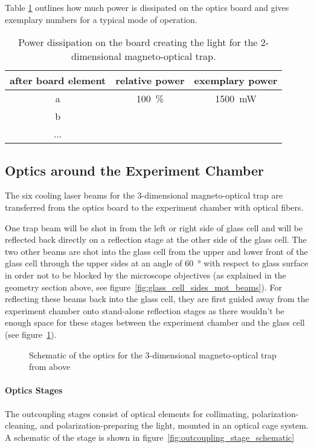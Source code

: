 Table \ref{tab:power_cascade} outlines how much power is dissipated on the optics board and gives exemplary numbers for a typical mode of operation.

\begin{table}
    \begin{tabularx}{\textwidth}{ccc}
        \toprule
        after board element & relative power & exemplary power \\
        \midrule
        a & \SI{100}{\percent} & \SI{1500}{\milli\watt}\\
        b && \\
        ... && \\
        \bottomrule
    \end{tabularx}
    \caption{Power dissipation on the board creating the light for the 2-dimensional magneto-optical trap.
    }
    \label{tab:power_cascade}
\end{table}


\subsection*{Optics around the Experiment Chamber}
The six cooling laser beams for the 3-dimensional magneto-optical trap are transferred from the optics board to the experiment chamber with optical fibers. 

One trap beam will be shot in from the left or right side of glass cell and will be reflected back directly on a reflection stage at the other side of the glass cell. The two other beams are shot into the glass cell from the upper and lower front of the glass cell through the upper sides at an angle of \SI{60}{\degree} with respect to glass surface in order not to be blocked by the microscope objectives (as explained in the geometry section above, see figure~\ref{fig:glass_cell_sides_mot_beams}). For reflecting these beams back into the glass cell, they are first guided away from the experiment chamber onto stand-alone reflection stages as there wouldn't be enough space for these stages between the experiment chamber and the glass cell (see figure~\ref{fig:mot_optics_schematic_from_above}).

\begin{figure}
    \caption{Schematic of the optics for the 3-dimensional magneto-optical trap from above}
    \label{fig:mot_optics_schematic_from_above}
\end{figure}

\paragraph{Optics Stages}
The outcoupling stages consist of optical elements for collimating, polarization-cleaning, and polarization-preparing the light, mounted in an optical cage system. A schematic of the stage is shown in figure~\ref{fig:outcoupling_stage_schematic}

